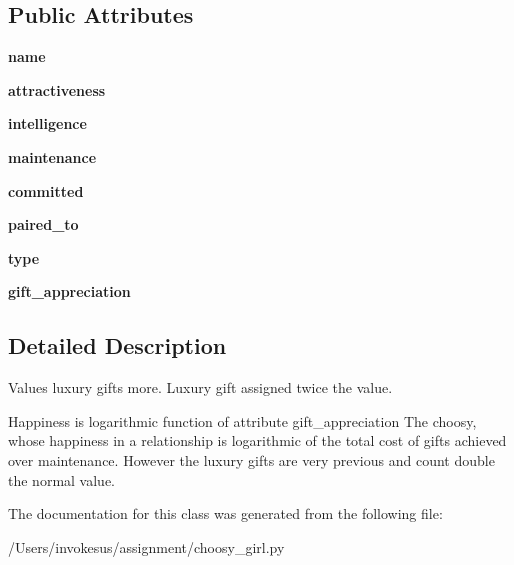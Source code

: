 \subsection*{Public Attributes}
\begin{DoxyCompactItemize}
\item 
\mbox{\label{classchoosy__girl_1_1_choosy___girl_ae7cb0183bc36e1c11b8c5537d5d63ae1}} 
{\bfseries name}
\item 
\mbox{\label{classchoosy__girl_1_1_choosy___girl_aa29f7649efcedb7de55f4c957b066708}} 
{\bfseries attractiveness}
\item 
\mbox{\label{classchoosy__girl_1_1_choosy___girl_a55514a230aceb875ed1c046960d013a3}} 
{\bfseries intelligence}
\item 
\mbox{\label{classchoosy__girl_1_1_choosy___girl_a26c2df2117a11696b43cc45fa01fcacd}} 
{\bfseries maintenance}
\item 
\mbox{\label{classchoosy__girl_1_1_choosy___girl_aa6f46babbde01f4e2c433c6a7b88f465}} 
{\bfseries committed}
\item 
\mbox{\label{classchoosy__girl_1_1_choosy___girl_a4f32f1de54c3f61a5227d4eac35c9acf}} 
{\bfseries paired\+\_\+to}
\item 
\mbox{\label{classchoosy__girl_1_1_choosy___girl_aa1ed305e2c8a9cec5b7c803dbac497af}} 
{\bfseries type}
\item 
\mbox{\label{classchoosy__girl_1_1_choosy___girl_ae997ec53e67e4529d3dba9f3d57fd523}} 
{\bfseries gift\+\_\+appreciation}
\end{DoxyCompactItemize}


\subsection{Detailed Description}
\begin{DoxyVerb}Values luxury gifts more.
Luxury gift assigned twice the value.

Happiness is logarithmic function of attribute gift_appreciation
The choosy, whose happiness in a relationship is logarithmic of the total cost of gifts achieved over maintenance. However the luxury gifts are very previous and count double the normal value.\end{DoxyVerb}
 

The documentation for this class was generated from the following file\+:\begin{DoxyCompactItemize}
\item 
/\+Users/invokesus/assignment/choosy\+\_\+girl.\+py\end{DoxyCompactItemize}
